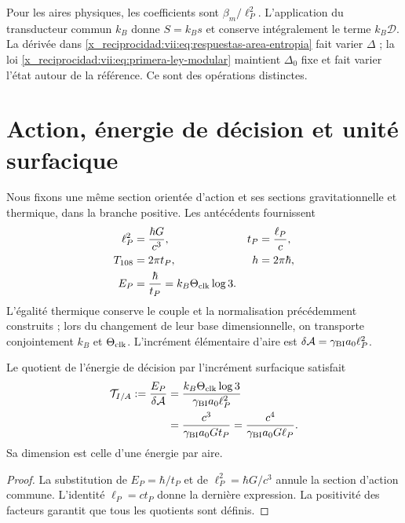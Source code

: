 Pour les aires physiques, les coefficients sont \(\beta_m/\ell_P^2\). L'application du transducteur commun \(k_B\) donne \(S=k_Bs\) et conserve intégralement le terme \(k_B\mathcal D\). La dérivée dans \eqref{x_reciprocidad:vii:eq:respuestas-area-entropia} fait varier \(\Delta\) ; la loi \eqref{x_reciprocidad:vii:eq:primera-ley-modular} maintient \(\Delta_0\) fixe et fait varier l'état autour de la référence. Ce sont des opérations distinctes.

\section{Action, énergie de décision et unité surfacique}
\label{x_reciprocidad:vii:subsec:conversion-informacion-area}

Nous fixons une même section orientée d'action et ses sections gravitationnelle et thermique, dans la branche positive. Les antécédents fournissent
\begin{equation}
 \begin{aligned}
 \ell_P^2&=\frac{\hbar G}{c^3},& t_P&=\frac{\ell_P}{c},\\
 T_{108}&=2\pi t_P,& h&=2\pi\hbar,\\
 E_P&=\frac{\hbar}{t_P}=k_B\Theta_{\rm clk}\log3.&&
 \end{aligned}
 \label{x_reciprocidad:vii:eq:unidad-accion-informacion}
\end{equation}
L'égalité thermique conserve le couple et la normalisation précédemment
construits ; lors du changement de leur base dimensionnelle, on transporte conjointement
\(k_B\) et \(\Theta_{\rm clk}\). L'incrément élémentaire d'aire est
\(\delta\mathcal A=\gamma_{\rm BI}a_0\ell_P^2\).

\begin{proposition}
\label{x_reciprocidad:vii:prop:tension-informacion-area}
Le quotient de l'énergie de décision par l'incrément surfacique satisfait
\begin{equation}
 \begin{aligned}
 \mathcal T_{I/A}:=\frac{E_P}{\delta\mathcal A}
 &=\frac{k_B\Theta_{\rm clk}\log3}{\gamma_{\rm BI}a_0\ell_P^2}\\
 &=\frac{c^3}{\gamma_{\rm BI}a_0G t_P}
  =\frac{c^4}{\gamma_{\rm BI}a_0G\ell_P}.
 \end{aligned}
 \label{x_reciprocidad:vii:eq:tension-informacion-area}
\end{equation}
Sa dimension est celle d'une énergie par aire.
\end{proposition}
\begin{proof}
La substitution de \(E_P=\hbar/t_P\) et de
\(\ell_P^2=\hbar G/c^3\) annule la section d'action commune.
L'identité \(\ell_P=ct_P\) donne la dernière expression. La positivité
des facteurs garantit que tous les quotients sont définis.
\end{proof}

